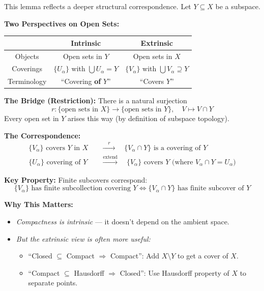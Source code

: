 \documentclass[11pt]{report}
\begin{document}
\begin{rembox}
This lemma reflects a deeper structural correspondence. Let $Y \subseteq X$ be a subspace.

\textbf{Two Perspectives on Open Sets:}
\begin{center}
\begin{tabular}{|c|c|c|}
\hline
& \textbf{Intrinsic} & \textbf{Extrinsic} \\
\hline
Objects & Open sets in $Y$ & Open sets in $X$ \\
\hline
Coverings & $\{U_\alpha\}$ with $\bigcup U_\alpha = Y$ & $\{V_\alpha\}$ with $\bigcup V_\alpha \supseteq Y$ \\
\hline
Terminology & ``Covering \textbf{of} $Y$'' & ``Covers $Y$'' \\
\hline
\end{tabular}
\end{center}

\textbf{The Bridge (Restriction):} There is a natural surjection
\[r: \{\text{open sets in } X\} \to \{\text{open sets in } Y\}, \quad V \mapsto V \cap Y\]
Every open set in $Y$ arises this way (by definition of subspace topology).

\textbf{The Correspondence:}
\begin{align*}
\{V_\alpha\} \text{ covers } Y \text{ in } X \quad &\xrightarrow{\quad r \quad} \quad \{V_\alpha \cap Y\} \text{ is a covering of } Y \\
\{U_\alpha\} \text{ covering of } Y \quad &\xrightarrow{\text{extend}} \quad \{V_\alpha\} \text{ covers } Y \text{ (where } V_\alpha \cap Y = U_\alpha\text{)}
\end{align*}

\textbf{Key Property:} Finite subcovers correspond:
\[\{V_\alpha\} \text{ has finite subcollection covering } Y \iff \{V_\alpha \cap Y\} \text{ has finite subcover of } Y\]

\textbf{Why This Matters:}
\begin{itemize}
    \item \textit{Compactness is intrinsic} --- it doesn't depend on the ambient space.
    \item \textit{But the extrinsic view is often more useful:}
    \begin{itemize}
        \item ``Closed $\subseteq$ Compact $\Rightarrow$ Compact'': Add $X \setminus Y$ to get a cover of $X$.
        \item ``Compact $\subseteq$ Hausdorff $\Rightarrow$ Closed'': Use Hausdorff property of $X$ to separate points.
    \end{itemize}
\end{itemize}
\end{rembox}
\end{document}
